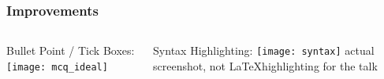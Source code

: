 \begin{frame}
  \frametitle{Improvements}
  \begin{columns}[c, onlytextwidth]
   \begin{column}{.4\textwidth}
      \setlength{\partopsep}{0pt}
       Bullet Point / Tick Boxes:\newline
      \texttt{[image: mcq\_ideal]}

      
   \end{column}
   \begin{column}{.55\textwidth}
       \setlength{\partopsep}{0pt}
        Syntax Highlighting:\newline
      \texttt{[image: syntax]}\newline
      \footnotesize{actual screenshot, not \LaTeX highlighting for the talk}

      
    \end{column}
  \end{columns}
  
\end{frame}






